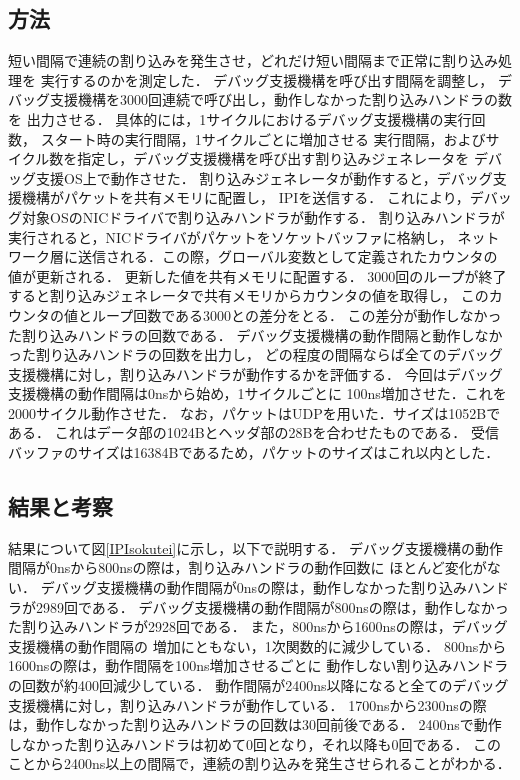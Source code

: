 \documentclass[tanilab-enum]{graduate}
\begin{document}
    \subsection{方法}
    短い間隔で連続の割り込みを発生させ，どれだけ短い間隔まで正常に割り込み処理を
    実行するのかを測定した．
    デバッグ支援機構を呼び出す間隔を調整し，
    デバッグ支援機構を3000回連続で呼び出し，動作しなかった割り込みハンドラの数を
    出力させる．
    具体的には，1サイクルにおけるデバッグ支援機構の実行回数，
    スタート時の実行間隔，1サイクルごとに増加させる
    実行間隔，およびサイクル数を指定し，デバッグ支援機構を呼び出す割り込みジェネレータを
    デバッグ支援OS上で動作させた．
    割り込みジェネレータが動作すると，デバッグ支援機構がパケットを共有メモリに配置し，
    IPIを送信する．
    これにより，デバッグ対象OSのNICドライバで割り込みハンドラが動作する．
    割り込みハンドラが実行されると，NICドライバがパケットをソケットバッファに格納し，
    ネットワーク層に送信される．この際，グローバル変数として定義されたカウンタの
    値が更新される．
    更新した値を共有メモリに配置する．
    3000回のループが終了すると割り込みジェネレータで共有メモリからカウンタの値を取得し，
    このカウンタの値とループ回数である3000との差分をとる．
    この差分が動作しなかった割り込みハンドラの回数である．
    デバッグ支援機構の動作間隔と動作しなかった割り込みハンドラの回数を出力し，
    どの程度の間隔ならば全てのデバッグ支援機構に対し，割り込みハンドラが動作するかを評価する．
    今回はデバッグ支援機構の動作間隔は0nsから始め，1サイクルごとに
    100ns増加させた．これを2000サイクル動作させた．
    なお，パケットはUDPを用いた．サイズは1052Bである．
    これはデータ部の1024Bとヘッダ部の28Bを合わせたものである．
    受信バッファのサイズは16384Bであるため，パケットのサイズはこれ以内とした．
    \subsection{結果と考察}

    結果について図\ref{IPIsokutei}に示し，以下で説明する．
    デバッグ支援機構の動作間隔が0nsから800nsの際は，割り込みハンドラの動作回数に
    ほとんど変化がない．
    デバッグ支援機構の動作間隔が0nsの際は，動作しなかった割り込みハンドラが2989回である．
    デバッグ支援機構の動作間隔が800nsの際は，動作しなかった割り込みハンドラが2928回である．
    また，800nsから1600nsの際は，デバッグ支援機構の動作間隔の
    増加にともない，1次関数的に減少している．
    800nsから1600nsの際は，動作間隔を100ns増加させるごとに
    動作しない割り込みハンドラの回数が約400回減少している．
    動作間隔が2400ns以降になると全てのデバッグ支援機構に対し，割り込みハンドラが動作している．
    1700nsから2300nsの際は，動作しなかった割り込みハンドラの回数は30回前後である．
    2400nsで動作しなかった割り込みハンドラは初めて0回となり，それ以降も0回である．
    このことから2400ns以上の間隔で，連続の割り込みを発生させられることがわかる．
   
\end{document}
